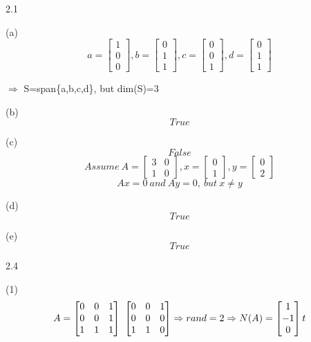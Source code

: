 \documentclass[a4paper,12pt]{article}
\begin{document}
2.1

(a)
\[
a=\begin{bmatrix} 1 \\ 0 \\ 0 \end{bmatrix},
b=\begin{bmatrix} 0 \\ 1 \\ 1 \end{bmatrix},
c=\begin{bmatrix} 0 \\ 0 \\ 1 \end{bmatrix},
d=\begin{bmatrix} 0 \\ 1 \\ 1 \end{bmatrix}
\]


$\Rightarrow$ S=span\{a,b,c,d\}, but dim(S)=3


(b)
\[
True
\]

(c)
\[
False
\]
\[
Assume~ A=\begin{bmatrix} 3 & 0 \\ 1 & 0 \end{bmatrix}, x=\begin{bmatrix} 0 \\ 1 \end{bmatrix}, y=\begin{bmatrix} 0 \\ 2 \end{bmatrix}
\]
\[
Ax=0~ and~ Ay=0,~but~ x\neq y
\]

(d)
\[
True
\]

(e)
\[
True
\]

2.4

(1)
\[
A=\begin{bmatrix} 0 & 0 & 1 \\ 0 & 0 & 1 \\ 1 & 1 & 1 \end{bmatrix}~\begin{bmatrix} 0 & 0 & 1 \\ 0 & 0 & 0 \\ 1 & 1 & 0 \end{bmatrix} \Rightarrow rand=2~ \\
\Rightarrow N(A)=\begin{bmatrix} 1 \\ -1 \\ 0 \end{bmatrix} t
\]
\end{document}
